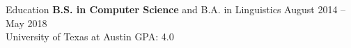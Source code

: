 \documentclass{resume} %
\begin{document}
\begin{rSection}{Education}
	{\bf B.S. in Computer Science} and B.A. in Linguistics \hfill {August 2014 -- May 2018}\\
	University of Texas at Austin \hfill {GPA: 4.0}\\
\end{rSection}

\iffalse
\begin{rSection}{PROJECTS}
	\vspace{-1.25em}
	\item \textbf{Short Project Title.} {Build a project that does something and had quantified success using A, B, and C. This project's description spans two lines and also won an award.}
\end{rSection} 
\fi
\end{document}
